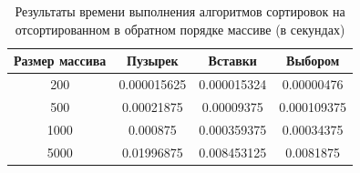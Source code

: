 \documentclass[14pt,russian]{scrartcl}
\begin{document}
    \begin{table}[htb]
        \caption{\centering Результаты времени выполнения алгоритмов сортировок на отсортированном в обратном порядке массиве (в секундах)}
        \centering
        \begin{tabular}{|c|c|c|c|}
        \hline
        Размер массива & Пузырек  & Вставки  & Выбором  \\ \hline
        200             & 0.000015625 & 0.000015324 & 0.00000476 \\ \hline
        500            & 0.00021875 & 0.00009375 & 0.000109375 \\ \hline
        1000            & 0.000875 & 0.000359375 & 0.00034375 \\ \hline
        5000           & 0.01996875 & 0.008453125 & 0.0081875 \\ \hline
        \end{tabular}
        \label{tab:unsorted_bench}
    \end{table}
\end{document}
